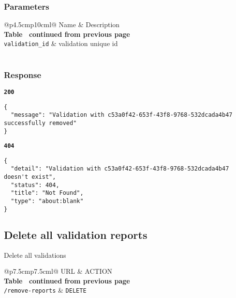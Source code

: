\subsubsection{Parameters}
\begin{longtable}[c]{@{}p{4.5cm}p{10cm}l@{}}
  \toprule
  Name                    & Description                       \\* \midrule
  \endfirsthead
  \multicolumn{3}{c}%
  {{\bfseries Table \thetable\ continued from previous page}} \\
  \endhead
  \bottomrule
  \endfoot
  \endlastfoot
  \texttt{validation\_id} & validation unique id              \\* \bottomrule
  \label{tab:rdf-validator-delete-validation-parameters}      \\
\end{longtable}

\subsubsection{Response}
\textbf{\texttt{200}}
\begin{lstlisting}
{
  "message": "Validation with c53a0f42-653f-43f8-9768-532dcada4b47 successfully removed"
}
\end{lstlisting}

\textbf{\texttt{404}}
\begin{lstlisting}
{
  "detail": "Validation with c53a0f42-653f-43f8-9768-532dcada4b47 doesn't exist",
  "status": 404,
  "title": "Not Found",
  "type": "about:blank"
}
\end{lstlisting}

\subsection{Delete all validation reports}
Delete all validations

\begin{longtable}[c]{@{}p{7.5cm}p{7.5cm}l@{}}
  \toprule
  URL                      & ACTION                           \\* \midrule
  \endfirsthead
  \multicolumn{3}{c}%
  {{\bfseries Table \thetable\ continued from previous page}} \\
  \endhead
  \bottomrule
  \endfoot
  \endlastfoot
  \texttt{/remove-reports} & \texttt{DELETE}                  \\* \bottomrule
  \label{tab:rdf-validator-delete-validations}                \\
\end{longtable}

